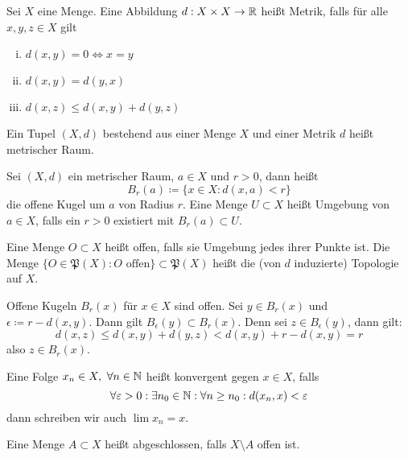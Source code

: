 \begin{defn} Sei $X$ eine Menge. Eine Abbildung $d:X\times X\to \mathbb{R}$ heißt Metrik, falls für alle $x,y,z\in X$ gilt
    \begin{enumerate}[(i)]
        \item $d(x,y) = 0 \Leftrightarrow x=y$
        \item $d(x,y) = d(y,x)$
        \item $d(x,z) \le d(x,y) + d(y,z)$
    \end{enumerate}
    Ein Tupel $(X,d)$ bestehend aus einer Menge $X$ und einer Metrik $d$ heißt metrischer Raum.
\end{defn}
\begin{defn}
    Sei $(X,d)$ ein metrischer Raum, $a\in X$ und $r>0$, dann heißt 
    \[
    B_r(a) \coloneqq \{x\in X : d(x,a) < r\}    
    \]
    die offene Kugel um $a$ von Radius $r$. Eine Menge $U\subset X$ heißt Umgebung von $a\in X$, falls ein $r>0$ existiert mit $B_r(a)\subset U$. 
\end{defn}
\begin{defn}
    Eine Menge $O\subset X$ heißt offen, falls sie Umgebung jedes ihrer Punkte ist. Die Menge $\{O\in \mathfrak{P}(X):O \textrm{ offen}\}\subset \mathfrak{P}(X)$ heißt die (von $d$ induzierte) Topologie auf $X$.
\end{defn}
\begin{bsp}
    Offene Kugeln $B_r(x)$ für $x\in X$ sind offen. Sei $y\in B_r(x)$ und $\epsilon \coloneqq r-d(x,y)$. Dann gilt $B_\epsilon(y)\subset B_r(x)$. Denn sei $z\in B_\epsilon(y)$, dann gilt:
    \[
    d(x,z) \le d(x,y) + d(y,z) < d(x,y) + r - d(x,y) = r   
    \]
    also $z\in B_r(x)$. 
\end{bsp}
\begin{defn}[Konvergenz] Eine Folge $x_n \in X, \ \forall n\in \mathbb{N}$ heißt konvergent gegen $x\in X$, falls 
    \[
    \forall \varepsilon > 0 :\exists n_0 \in \mathbb{N}:\forall n\ge n_0 : d(x_n,x) < \varepsilon     
    \]
    dann schreiben wir auch $\lim x_n = x$. 
\end{defn}
\begin{defn}
    Eine Menge $A\subset X$ heißt abgeschlossen, falls $X\setminus A$ offen ist. 
\end{defn}

